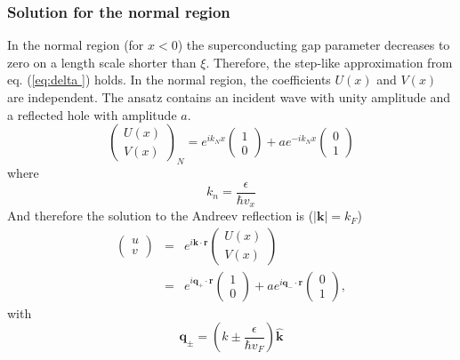 \subsubsection*{Solution for the normal region}
In the normal region (for $x < 0$) the superconducting gap parameter decreases to zero on a length scale shorter than $\xi$. Therefore, the step-like approximation from eq. (\ref{eq:delta }) holds. In the normal region, 
the coefficients $U(x)$ and $V(x)$ are independent. The ansatz contains an incident wave with unity amplitude and a reflected hole with amplitude $a$. 
\begin{equation}
\begin{pmatrix} U(x) \\ V(x) \end{pmatrix}_N = e^{i k_N x } \begin{pmatrix} 1 \\ 0 \end{pmatrix} + a e^{-i k_N x } \begin{pmatrix} 0 \\ 1 \end{pmatrix} 
\end{equation}
where 
\begin{equation}
k_n = \frac{\epsilon}{\hbar v_x}
\end{equation}
And therefore the solution to the Andreev reflection is ($|\mathbf{k}| = k_F$)
\begin{eqnarray}
\begin{pmatrix} u \\v \end{pmatrix} &=& e^{i\mathbf{k} \cdot \mathbf{r}} \begin{pmatrix} U(x) \\V(x) \end{pmatrix}\\
&=& e^{i\mathbf{q}_+ \cdot \mathbf{r}} \begin{pmatrix} 1 \\ 0\end{pmatrix} + a e^{i\mathbf{q}_- \cdot \mathbf{r}} \begin{pmatrix} 0 \\ 1\end{pmatrix},
\end{eqnarray}
with
\begin{equation}
\mathbf{q}_\pm =  \left( k \pm \frac{\epsilon}{\hbar v_F} \right) \hat{\mathbf{k}} 
\end{equation}

